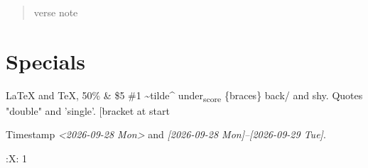 \documentclass[11pt]{article}
\begin{document}
\begin{verse}
verse note\footnotemark\\
\end{verse}
\section{Specials}
\label{sec:org948d328}
\LaTeX{} and \TeX{}, 50\% \& \$5 \#1 \textasciitilde{}tilde\^{} under\textsubscript{score} \{braces\} back/ and \-shy.
Quotes "double" and 'single'.
{[}bracket at start
\newpage
\listoftables
Timestamp \textit{<2026-09-28 Mon> } and \textit{{[}2026-09-28 Mon]--[2026-09-29 Tue]}.

\begin{center}
\end{center}

:X: 1
\end{document}
